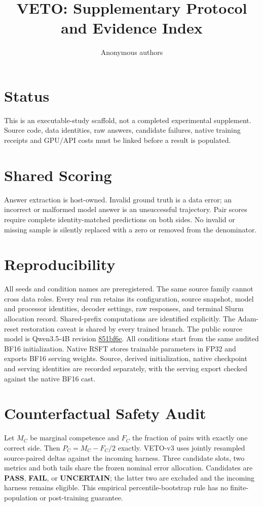 \documentclass[10pt,twocolumn,letterpaper]{article}
\title{VETO: Supplementary Protocol and Evidence Index}
\author{Anonymous authors}
\begin{document}
\maketitle
\section{Status}
This is an executable-study scaffold, not a completed experimental supplement.
Source code, data identities, raw answers, candidate failures, native training
receipts and GPU/API costs must be linked before a result is populated.
\section{Shared Scoring}
Answer extraction is host-owned. Invalid ground truth is a data error; an
incorrect or malformed model answer is an unsuccessful trajectory. Pair scores
require complete identity-matched predictions on both sides. No invalid or
missing sample is silently replaced with a zero or removed from the denominator.
\section{Reproducibility}
All seeds and condition names are preregistered. The same source family cannot
cross data roles. Every real run retains its configuration, source snapshot,
model and processor identities, decoder settings, raw responses, and terminal
Slurm allocation record. Shared-prefix computations are identified explicitly.
The Adam-reset restoration caveat is shared by every trained branch.
The public source model is Qwen3.5-4B revision
\href{https://huggingface.co/Qwen/Qwen3.5-4B/tree/851bf6e806efd8d0a36b00ddf55e13ccb7b8cd0a}{851bf6e}.
All conditions start from the same audited BF16 initialization. Native RSFT
stores trainable parameters in FP32 and exports BF16 serving weights. Source,
derived initialization, native checkpoint and serving identities are recorded
separately, with the serving export checked against the native BF16 cast.
\section{Counterfactual Safety Audit}
Let $M_C$ be marginal competence and $F_C$ the fraction of pairs with exactly
one correct side. Then $P_C=M_C-F_C/2$ exactly. VETO-v3 uses jointly resampled
source-paired deltas against the incoming harness. Three candidate slots, two
metrics and both tails share the frozen nominal error allocation. Candidates
are \textbf{PASS}, \textbf{FAIL}, or \textbf{UNCERTAIN}; the latter two are excluded
and the incoming harness remains eligible. This empirical percentile-bootstrap
rule has no finite-population or post-training guarantee.
\end{document}
